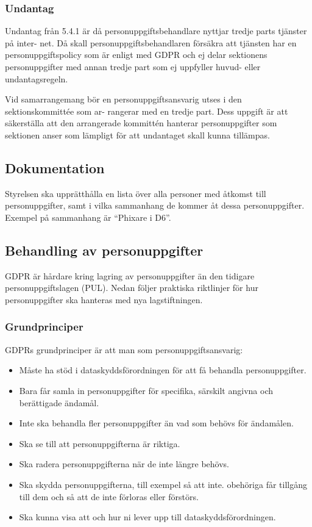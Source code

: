 \subsubsection{Undantag}
Undantag från 5.4.1 är då personuppgiftsbehandlare nyttjar tredje parts tjänster på inter-
net. Då skall personuppgiftsbehandlaren försäkra att tjänsten har en personuppgiftspolicy som är enligt med GDPR och ej delar sektionens personuppgifter med annan tredje part
som ej uppfyller huvud- eller undantagsregeln.

Vid samarrangemang bör en personuppgiftsansvarig utses i den sektionskommittée som ar-
rangerar med en tredje part. Dess uppgift är att säkerställa att den arrangerade kommittén
hanterar personuppgifter som sektionen anser som lämpligt för att undantaget skall kunna
tillämpas.

\subsection{Dokumentation}
Styrelsen ska upprätthålla en lista över alla personer med åtkomst till personuppgifter,
samt i vilka sammanhang de kommer åt dessa personuppgifter. Exempel på sammanhang
är \enquote{Phixare i D6}.

\subsection{Behandling av personuppgifter}
GDPR är hårdare kring lagring av personuppgifter än den tidigare personuppgiftslagen
(PUL). Nedan följer praktiska riktlinjer för hur personuppgifter ska hanteras med nya
lagstiftningen.

\subsubsection{Grundprinciper}
GDPRs grundprinciper är att man som personuppgiftsansvarig:
\begin{itemize}
    \item Måste ha stöd i dataskyddsförordningen för att få behandla personuppgifter.
    \item Bara får samla in personuppgifter för specifika, särskilt angivna och berättigade ändamål.
    \item Inte ska behandla fler personuppgifter än vad som behövs för ändamålen.
    \item Ska se till att personuppgifterna är riktiga.
    \item Ska radera personuppgifterna när de inte längre behövs.
    \item Ska skydda personuppgifterna, till exempel så att inte. obehöriga får tillgång till dem och så att de inte förloras eller förstörs.
    \item Ska kunna visa att och hur ni lever upp till dataskyddsförordningen.
\end{itemize}

